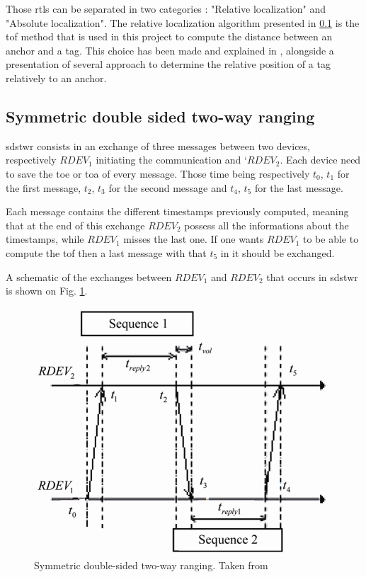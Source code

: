 Those \gls{rtls} can be separated in two categories : "Relative localization" and "Absolute localization". The relative localization algorithm presented in \ref{sds2wr} is the \gls{tof} method that is used in this project to compute the distance between an anchor and a tag. This choice has been made and explained in \cite{fesler2018high}, \cite{hannotier2019indoor} alongside a presentation of several approach to determine the relative position of a tag relatively to an anchor.


\subsection{Symmetric double sided two-way ranging}
\label{sds2wr}

\gls{sdstwr} consists in an exchange of three messages between two devices, respectively $RDEV_1$ initiating the communication and `$RDEV_2$. Each device need to save the \gls{toe} or \gls{toa} of every message. Those time being respectively $t_0$, $t_1$ for the first message, $t_2$, $t_3$ for the second message and $t_4$, $t_5$ for the last message.

Each message contains the different timestamps previously computed, meaning that at the end of this exchange $RDEV_2$ possess all the informations about the timestamps, while $RDEV_1$ misses the last one. If one wants $RDEV_1$ to be able to compute the \gls{tof} then a last message with that $t_5$ in it should be exchanged.

A schematic of the exchanges between $RDEV_1$ and $RDEV_2$ that occurs in \gls{sdstwr} is shown on Fig. \ref{sdstwr}. 

\begin{figure}[H]
\centering
\includegraphics[width=.6\linewidth]{Images/sds-twr.png}
\caption{Symmetric double-sided two-way ranging. Taken from \cite{dalce2011comparison}}
\label{sdstwr}
\end{figure}

